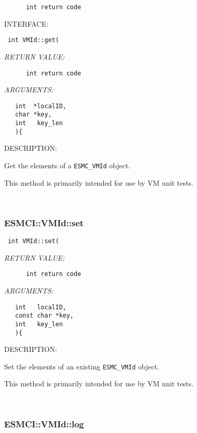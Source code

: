   
\begin{verbatim}      int return code\end{verbatim}{\sf INTERFACE:}
\begin{verbatim} int VMId::get(\end{verbatim}{\em RETURN VALUE:}
\begin{verbatim}      int return code\end{verbatim}{\em ARGUMENTS:}
\begin{verbatim}   int  *localID,
   char *key,
   int   key_len
   ){\end{verbatim}
{\sf DESCRIPTION:\\ }


      Get the elements of a {\tt ESMC\_VMId} object.
  
      This method is primarily intended for use by VM unit tests.
   
 
\mbox{}\hrulefill\
 
\subsubsection [ESMCI::VMId::set] {ESMCI::VMId::set}


  
\begin{verbatim} int VMId::set(\end{verbatim}{\em RETURN VALUE:}
\begin{verbatim}      int return code\end{verbatim}{\em ARGUMENTS:}
\begin{verbatim}   int   localID,
   const char *key,
   int   key_len
   ){\end{verbatim}
{\sf DESCRIPTION:\\ }


      Set the elements of an existing {\tt ESMC\_VMId} object.
  
      This method is primarily intended for use by VM unit tests.
   
 
\mbox{}\hrulefill\
 
\subsubsection [ESMCI::VMId::log] {ESMCI::VMId::log}


